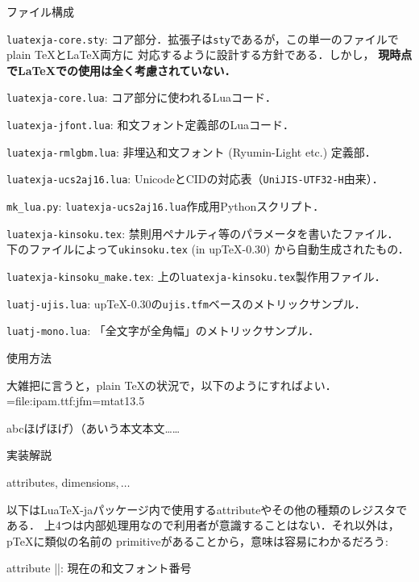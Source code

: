\beginparagraph ファイル構成


\item {\tt luatexja-core.sty}: 
コア部分．拡張子は{\tt sty}であるが，この単一のファイルでplain \TeX と\LaTeX 両方に
対応するように設計する方針である．しかし，
{\bf 現時点で\LaTeX での使用は全く考慮されていない．}
\item {\tt luatexja-core.lua}: コア部分に使われるLuaコード．
\item {\tt luatexja-jfont.lua}: 和文フォント定義部のLuaコード．
\item {\tt luatexja-rmlgbm.lua}: 非埋込和文フォント (Ryumin-Light etc.) 定義部．
\item {\tt luatexja-ucs2aj16.lua}: UnicodeとCIDの対応表（{\tt UniJIS-UTF32-H}由来）．
\item {\tt mk\_lua.py}: {\tt luatexja-ucs2aj16.lua}作成用Pythonスクリプト．

\item {\tt luatexja-kinsoku.tex}: 禁則用ペナルティ等のパラメータを書いたファイル．
下のファイルによって{\tt ukinsoku.tex} (in up\TeX-0.30) から自動生成されたもの．
\item {\tt luatexja-kinsoku\_make.tex}: 上の{\tt luatexja-kinsoku.tex}製作用ファイル．
\item {\tt luatj-ujis.lua}: up\TeX-0.30の{\tt ujis.tfm}ベースのメトリックサンプル．
\item {\tt luatj-mono.lua}: 「全文字が全角幅」のメトリックサンプル．
\enditem

\beginsection 使用方法

大雑把に言うと，plain \TeX の状況で，以下のようにすればよい．
\begintt
\jfont\tenipam={file:ipam.ttf:jfm=mt}at13.5\jQ 
\tenipam{}\zw 
{}                 %

\rm abcほげほげ）（あいう本文本文……
\endtt

\beginsection 実装解説

\beginparagraph attributes, dimensions,$\,\ldots$

以下はLua\TeX-jaパッケージ内で使用するattributeやその他の種類のレジスタである．
上4つは内部処理用なので利用者が意識することはない．それ以外は，p\TeX に類似の名前の
primitiveがあることから，意味は容易にわかるだろう:

\item attribute |\luatexja@curjfnt|: 現在の和文フォント番号

